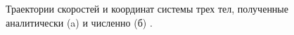 \begin{figure}[h]
    \begin{minipage}[h]{0.5\linewidth}
    \end{minipage}
    \hfill  
    \begin{minipage}[h]{0.5\linewidth}
    \end{minipage}
    \caption{Траектории скоростей и координат системы трех тел, полученные аналитически (a) и численно (б) .}
    \label{fig:anchi}
\end{figure}